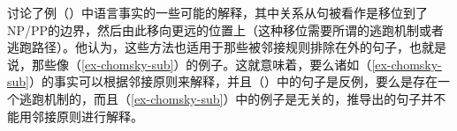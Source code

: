 \citet[--54]{Koster78b-u}讨论了例（）中语言事实的一些可能的解释，其中关系从句被看作是移位到了NP/PP的边界，然后由此移向更远的位置上（这种移位需要所谓的逃跑机制或者逃跑路径）。他认为，这些方法也适用于那些被邻接规则排除在外的句子，也就是说，那些像（\ref{ex-chomsky-sub}）的例子。这就意味着，要么诸如（\ref{ex-chomsky-sub}）的事实可以根据邻接原则来解释，并且（）中的句子是反例，要么是存在一个逃跑机制的，而且（\ref{ex-chomsky-sub}）中的例子是无关的，推导出的句子并不能用邻接原则进行解释。

